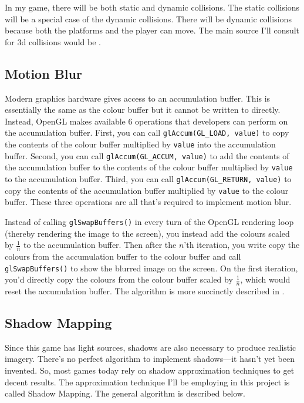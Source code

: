 \documentclass[11pt]{article}
\begin{document}
In my game, there will be both static and dynamic collisions. The static collisions will be a special case of the dynamic collisions. There will be dynamic collisions because both the platforms and the player can move. The main source I'll consult for 3d collisions would be \cite{mdn3dcd}.

\subsection*{Motion Blur}
Modern graphics hardware gives access to an accumulation buffer. This is essentially the same as the colour buffer but it cannot be written to directly. Instead, OpenGL makes available 6 operations that developers can perform on the accumulation buffer. First, you can call \verb|glAccum(GL_LOAD, value)| to copy the contents of the colour buffer multiplied by \verb|value| into the accumulation buffer. Second, you can call \verb|glAccum(GL_ACCUM, value)| to add the contents of the accumulation buffer to the contents of the colour buffer multiplied by \verb|value| to the accumulation buffer. Third, you can call \verb|glAccum(GL_RETURN, value)| to copy the contents of the accumulation buffer multiplied by \verb|value| to the colour buffer. These three operations are all that's required to implement motion blur.

Instead of calling \verb|glSwapBuffers()| in every turn of the OpenGL rendering loop (thereby rendering the image to the screen), you instead add the colours scaled by $\frac{1}{n}$ to the accumulation buffer. Then after the $n$'th iteration, you write copy the colours from the accumulation buffer to the colour buffer and call \verb|glSwapBuffers()| to show the blurred image on the screen. On the first iteration, you'd directly copy the colours from the colour buffer scaled by $\frac{1}{n}$, which would reset the accumulation buffer. The algorithm is more succinctly described in \cite{wikibooks-motion-blur}. 

\subsection*{Shadow Mapping}
Since this game has light sources, shadows are also necessary to produce realistic imagery. There's no perfect algorithm to implement shadows---it hasn't yet been invented. So, most games today rely on shadow approximation techniques to get decent results. The approximation technique I'll be employing in this project is called Shadow Mapping. The general algorithm is described below.
\end{document}
